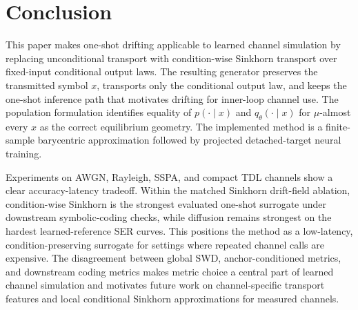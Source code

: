 \documentclass[10pt,journal]{IEEEtran}
\begin{document}
\section{Conclusion}
This paper makes one-shot drifting applicable to learned channel simulation by replacing unconditional transport with condition-wise Sinkhorn transport over fixed-input conditional output laws.
The resulting generator preserves the transmitted symbol \(x\), transports only the conditional output law, and keeps the one-shot inference path that motivates drifting for inner-loop channel use.
The population formulation identifies equality of \(p(\cdot\mid x)\) and \(q_\theta(\cdot\mid x)\) for \(\mu\)-almost every \(x\) as the correct equilibrium geometry.
The implemented method is a finite-sample barycentric approximation followed by projected detached-target neural training.

Experiments on AWGN, Rayleigh, SSPA, and compact TDL channels show a clear accuracy-latency tradeoff.
Within the matched Sinkhorn drift-field ablation, condition-wise Sinkhorn is the strongest evaluated one-shot surrogate under downstream symbolic-coding checks, while diffusion remains strongest on the hardest learned-reference SER curves.
This positions the method as a low-latency, condition-preserving surrogate for settings where repeated channel calls are expensive.
The disagreement between global SWD, anchor-conditioned metrics, and downstream coding metrics makes metric choice a central part of learned channel simulation and motivates future work on channel-specific transport features and local conditional Sinkhorn approximations for measured channels.


\end{document}
